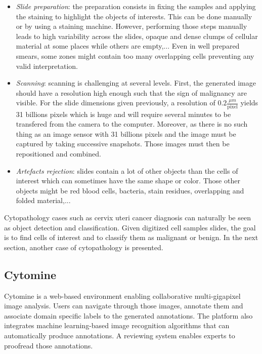 \begin{itemize}
	\item \textit{Slide preparation}: the preparation consists in fixing the samples and applying the staining to highlight the objects of interests. This can be done manually or by using a staining machine. However, performing those steps manually leads to high variability across the slides, opaque and dense clumps of cellular material at some places while others are empty,... Even in well prepared smears, some zones might contain too many overlapping cells preventing any valid interpretation. 
	\item \textit{Scanning}: scanning is challenging at several levels. First, the generated image should have a resolution high enough such that the sign of malignancy are visible. For the slide dimensions given previously, a resolution of $0.2 \frac{\mu m}{\text{pixel}}$ yields 31 billions pixels which is huge and will require several minutes to be transfered from the camera to the computer. Moreover, as there is no such thing as an image sensor with 31 billions pixels and the image must be captured by taking successive snapshots. Those images must then be repositioned and combined.
	\item \textit{Artefacts rejection}: slides contain a lot of other objects than the cells of interest which can sometimes have the same shape or color. Those other objects might be red blood cells, bacteria, stain residues, overlapping and folded material,... 
\end{itemize}

Cytopathology cases such as cervix uteri cancer diagnosis can naturally be seen as object detection and classification. Given digitized cell samples slides, the goal is to find cells of interest and to classify them as malignant or benign. In the next section, another case of cytopathology is presented.

\subsection{Cytomine} 
\label{sssec:detect_cytomine}
Cytomine \cite{maree2016collaborative} is a web-based environment enabling collaborative multi-gigapixel image analysis. Users can navigate through those images, annotate them and associate domain specific labels to the generated annotations. The platform also integrates machine learning-based image recognition algorithms that can automatically produce annotations. A reviewing system enables experts to proofread those annotations. 

